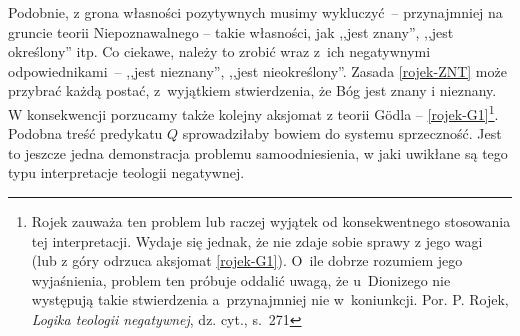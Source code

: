 Podobnie, z grona własności pozytywnych musimy
wykluczyć~-- przynajmniej na gruncie teorii Niepoznawalnego -- takie
własności, jak ,,jest znany'', ,,jest określony'' itp. Co ciekawe,
należy to zrobić wraz z~ich negatywnymi
odpowiednikami~-- ,,jest nieznany'', ,,jest nieokreślony''.
Zasada \ref{rojek-ZNT} może przybrać każdą postać, z~wyjątkiem stwierdzenia, że Bóg jest znany i nieznany.
W konsekwencji porzucamy także kolejny aksjomat z teorii Gödla -- \eqref{rojek-G1}\footnote{Rojek zauważa ten problem lub raczej wyjątek od konsekwentnego stosowania tej
interpretacji.
Wydaje się jednak, że nie zdaje sobie sprawy z jego wagi (lub z góry odrzuca aksjomat \eqref{rojek-G1}). O~ile dobrze rozumiem jego wyjaśnienia, problem ten próbuje oddalić uwagą, że u~Dionizego nie występują takie stwierdzenia
a~przynajmniej nie w~koniunkcji. Por. P. Rojek, \textit{Logika teologii negatywnej}, dz. cyt., s.~271}.
Podobna treść predykatu $Q$ sprowadziłaby bowiem do systemu sprzeczność.
Jest to jeszcze jedna demonstracja problemu samoodniesienia, w jaki uwikłane są tego typu interpretacje
teologii negatywnej.




